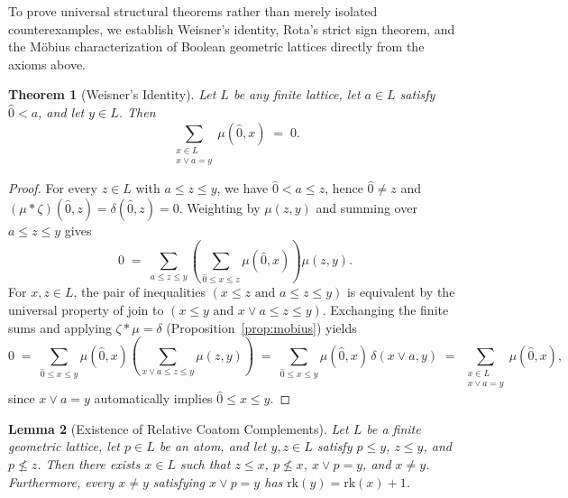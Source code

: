 \documentclass[11pt]{article}
\newtheorem{theorem}{Theorem}[section]
\newtheorem{lemma}[theorem]{Lemma}
\theoremstyle{definition}
\theoremstyle{remark}
\newcommand{\rk}{\mathrm{rk}}
\newcommand{\hatzero}{\hat{0}}
\begin{document}
To prove universal structural theorems rather than merely isolated counterexamples, we establish Weisner's identity, Rota's strict sign theorem, and the M\"obius characterization of Boolean geometric lattices directly from the axioms above.

\begin{theorem}[Weisner's Identity]
\label{thm:weisner}
Let $L$ be any finite lattice, let $a \in L$ satisfy $\hatzero < a$, and let $y \in L$. Then
\[
  \sum_{\substack{x \in L \\ x \vee a = y}} \mu(\hatzero, x) \;=\; 0.
\]
\end{theorem}

\begin{proof}
For every $z \in L$ with $a \le z \le y$, we have $\hatzero < a \le z$, hence $\hatzero \neq z$ and $(\mu * \zeta)(\hatzero, z) = \delta(\hatzero, z) = 0$. Weighting by $\mu(z, y)$ and summing over $a \le z \le y$ gives
\[
  0 \;=\; \sum_{a \le z \le y} \left(\sum_{\hatzero \le x \le z} \mu(\hatzero, x)\right) \mu(z, y).
\]
For $x, z \in L$, the pair of inequalities $(x \le z \text{ and } a \le z \le y)$ is equivalent by the universal property of join to $(x \le y \text{ and } x \vee a \le z \le y)$. Exchanging the finite sums and applying $\zeta * \mu = \delta$ (Proposition~\ref{prop:mobius}) yields
\[
  0 \;=\; \sum_{\hatzero \le x \le y} \mu(\hatzero, x) \left(\sum_{x \vee a \le z \le y} \mu(z, y)\right) \;=\; \sum_{\hatzero \le x \le y} \mu(\hatzero, x)\,\delta(x \vee a, y) \;=\; \sum_{\substack{x \in L \\ x \vee a = y}} \mu(\hatzero, x),
\]
since $x \vee a = y$ automatically implies $\hatzero \le x \le y$.
\end{proof}

\begin{lemma}[Existence of Relative Coatom Complements]
\label{lem:coatom}
Let $L$ be a finite geometric lattice, let $p \in L$ be an atom, and let $y, z \in L$ satisfy $p \le y$, $z \le y$, and $p \not\le z$. Then there exists $x \in L$ such that $z \le x$, $p \not\le x$, $x \vee p = y$, and $x \neq y$. Furthermore, every $x \neq y$ satisfying $x \vee p = y$ has $\rk(y) = \rk(x) + 1$.
\end{lemma}
\end{document}
